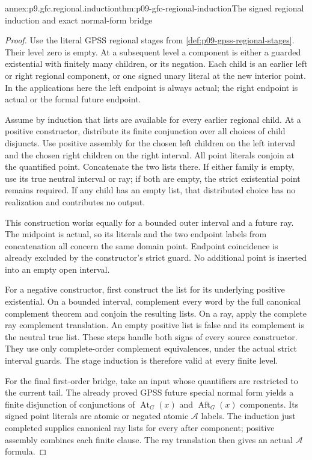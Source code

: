 \begin{annexitem}{annex:p9.gfc.regional.induction}{thm:p09-gfc-regional-induction}{The signed regional induction and exact normal-form bridge}
\begin{proof}
Use the literal GPSS regional stages from
\cref{def:p09-gpss-regional-stages}.
Their level zero is empty. At a subsequent
level a component is either a guarded
existential with finitely many children,
or its negation. Each child is an earlier
left or right regional component, or
one signed unary literal at the new
interior point. In the applications here
the left endpoint is always actual;
the right endpoint is actual or the
formal future endpoint.

Assume by induction that lists are
available for every earlier regional
child. At a positive constructor,
distribute its finite conjunction over
all choices of child disjuncts.
Use positive assembly for the chosen
left children on the left interval
and the chosen right children on
the right interval. All point
literals conjoin at the quantified
point. Concatenate the two lists
there. If either family is empty,
use its true neutral interval or
ray; if both are empty, the
strict existential point remains
required. If any child has an
empty list, that distributed
choice has no realization and
contributes no output.

This construction works equally
for a bounded outer interval
and a future ray. The midpoint
is actual, so its literals and
the two endpoint labels from
concatenation all concern the
same domain point. Endpoint
coincidence is already excluded
by the constructor's strict
guard. No additional point
is inserted into an empty
open interval.

For a negative constructor,
first construct the list for
its underlying positive
existential. On a bounded
interval, complement every
word by the full canonical
complement theorem and
conjoin the resulting lists.
On a ray, apply the complete
ray complement translation.
An empty positive list is
false and its complement
is the neutral true list.
These steps handle both
signs of every source
constructor. They use
only complete-order
complement equivalences,
under the actual strict
interval guards. The
stage induction is
therefore valid at
every finite level.

For the final first-order
bridge, take an input
whose quantifiers are
restricted to the
current tail. The
already proved GPSS
future special normal
form yields a finite
disjunction of conjunctions
of \(\operatorname{At}_G(x)\)
and \(\operatorname{Aft}_G(x)\)
components. Its signed
point literals are
atomic or negated
atomic \(\mathcal A\)
labels. The induction
just completed supplies
canonical ray lists
for every after
component; positive
assembly combines
each finite clause.
The ray translation
then gives an actual
\(\mathcal A\) formula.


\end{proof}
\end{annexitem}
